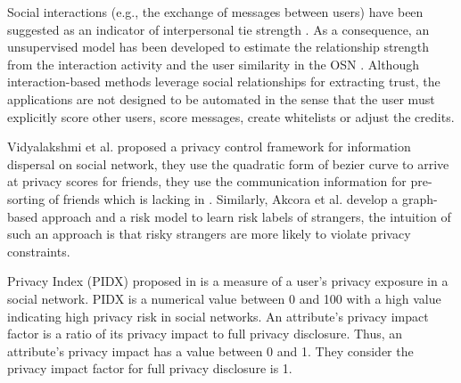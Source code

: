 Social interactions (e.g.,
	the exchange of messages between users) have been suggested as an indicator of interpersonal tie strength \cite{xiang_modeling_2010}.
As a consequence,
	an unsupervised model has been developed to estimate the 
		relationship strength from the interaction activity and the user similarity in the OSN \cite{xiang_modeling_2010}.
Although interaction-based methods leverage social relationships for extracting trust,
	the applications are not designed to be automated in the sense that the user must explicitly score other users,
	score messages,
	create whitelists or adjust the credits.



Vidyalakshmi et al. \cite{b.s._privacy_2015} proposed a privacy control framework for information dispersal on social network,
	they use the quadratic form of bezier curve to arrive at privacy scores for friends,
	they use the communication information for pre-sorting of friends which is lacking in \cite{vidyalakshmi_privacy_2015}.
Similarly,
Akcora et al. \cite{akcora_risks_2012} develop a graph-based approach and a risk model to learn risk labels of strangers,
	the intuition of such an approach is that risky strangers are more likely to violate privacy constraints.

Privacy Index (PIDX) proposed in \cite{nepali_sonet_2013} is a measure of a user’s privacy exposure in a social network.
PIDX is a numerical value between 0 and 100 with a high value indicating high privacy risk in social networks.
An attribute’s privacy impact factor is a ratio of its privacy impact to full privacy disclosure.
Thus,
	an attribute’s privacy impact has a value between 0 and 1.
They consider the privacy impact factor for full privacy disclosure is 1.

